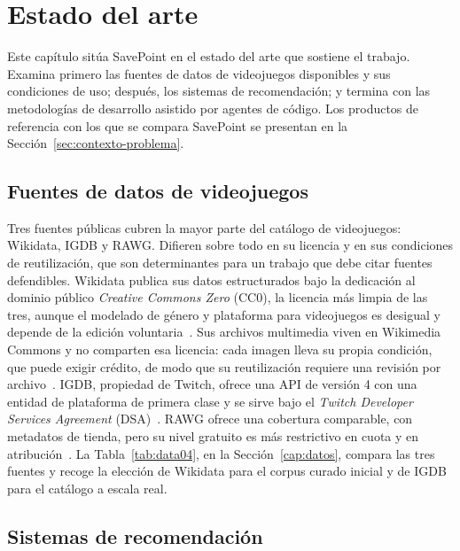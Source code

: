 \chapter{Estado del arte}\label{cap:estado-del-arte}

Este capítulo sitúa SavePoint en el estado del arte que sostiene el trabajo. Examina primero
las fuentes de datos de videojuegos disponibles y sus condiciones de uso; después, los sistemas
de recomendación; y termina con las metodologías de desarrollo asistido por agentes de código.
Los productos de referencia con los que se compara SavePoint se presentan en la
Sección~\ref{sec:contexto-problema}.

\section{Fuentes de datos de videojuegos}\label{sec:arte-datos}

Tres fuentes públicas cubren la mayor parte del catálogo de videojuegos: Wikidata, IGDB y
RAWG. Difieren sobre todo en su licencia y en sus condiciones de reutilización, que son
determinantes para un trabajo que debe citar fuentes defendibles. Wikidata publica sus datos
estructurados bajo la dedicación al dominio público \textit{Creative Commons Zero} (CC0), la
licencia más limpia de las tres, aunque el modelado de género y plataforma para videojuegos es
desigual y depende de la edición voluntaria~\cite{wikidata-licensing}. Sus archivos
multimedia viven en Wikimedia Commons y no comparten esa licencia: cada imagen lleva su propia
condición, que puede exigir crédito, de modo que su reutilización requiere una revisión por
archivo~\cite{commons-reuse}. IGDB, propiedad de Twitch, ofrece una API de versión 4 con una
entidad de plataforma de primera clase y se sirve bajo el \textit{Twitch Developer Services
Agreement} (DSA)~\cite{igdb-api, twitch-dsa}. RAWG ofrece una cobertura comparable, con
metadatos de tienda, pero su nivel gratuito es más restrictivo en cuota y en atribución~\cite{rawg-api}.
La Tabla~\ref{tab:data04}, en la Sección~\ref{cap:datos}, compara las tres fuentes y recoge la
elección de Wikidata para el corpus curado inicial y de IGDB para el catálogo a escala real.

\section{Sistemas de recomendación}\label{sec:arte-recomendacion}

